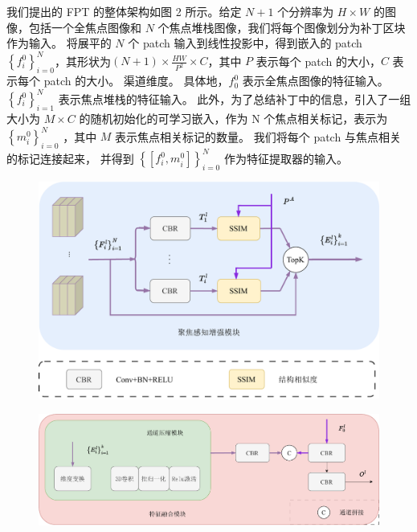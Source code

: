 %
%
%
%
%
我们提出的 FPT 的整体架构如图 2 所示。给定 $N + 1$ 个分辨率为 $ H \times W $ 的图像，包括一个全焦点图像和 $N$ 个焦点堆栈图像，我们将每个图像划分为补丁区块作为输入。 
将展平的 $N$ 个 patch 输入到线性投影中，得到嵌入的 patch $ \left \{ f_{i}^{0} \right \}_{i=0}^{N} $，其形状为$ \left ( N + 1 \right ) \times \frac{HW}{P^{2}} \times C  $，其中 $P$ 表示每个 patch 的大小，$C$ 表示每个 patch 的大小。 
渠道维度。 
%
%
%
%
具体地，$ f_{0}^{0} $ 表示全焦点图像的特征输入。 
$ \left \{ f_{i}^{0} \right \}_{i=1}^{N} $ 表示焦点堆栈的特征输入。 
此外，为了总结补丁中的信息，引入了一组大小为 $ M \times C $ 的随机初始化的可学习嵌入，作为 { }N 个焦点相关标记，表示为 $ \left \{ m_{i}^{0} \right \}_{i=0}^{N} $ ，其中 $M$ 表示焦点相关标记的数量。 
我们将每个 patch 与焦点相关的标记连接起来，
并得到 $ \left \{ \left [ f_{i}^{0},m_{i}^{0}  \right ]  \right \}_{i=0}^{N} $ 作为特征提取器的输入。 
%
%
%
%
\begin{figure}[!ht]
	\centering
	\includegraphics[width=0.90\linewidth]{figures/chapter3/fpe}
	\label{cpt3_fig1:fpe}
\end{figure}
%
%
%
%
\begin{figure}[!ht]
	\centering
	\includegraphics[width=0.95\linewidth]{figures/chapter3/ccm}
	\label{cpt3_fig1:ccm}
\end{figure}
